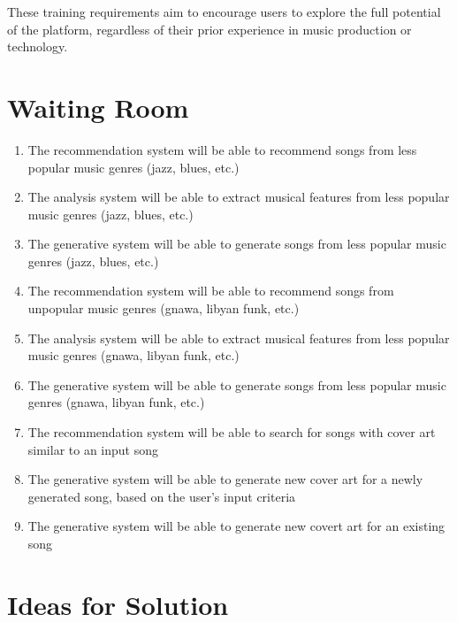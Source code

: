 \documentclass[12pt]{article}
\begin{document}
These training requirements aim to encourage users to explore the full potential of the platform, regardless of their prior experience in music production or technology.


\section{Waiting Room}
\begin{enumerate}
  \item The recommendation system will be able to recommend songs from less popular music genres (jazz, blues, etc.)
  \item The analysis system will be able to extract musical features from less popular music genres (jazz, blues, etc.)
  \item The generative system will be able to generate songs from less popular music genres (jazz, blues, etc.)
  \item The recommendation system will be able to recommend songs from unpopular music genres (gnawa, libyan funk, etc.)
  \item The analysis system will be able to extract musical features from less popular music genres (gnawa, libyan funk, etc.)
  \item The generative system will be able to generate songs from less popular music genres (gnawa, libyan funk, etc.)
  \item The recommendation system will be able to search for songs with cover art similar to an input song
  \item The generative system will be able to generate new cover art for a newly generated song, based on the user's
  input criteria
  \item The generative system will be able to generate new covert art for an existing song
\end{enumerate}

\section{Ideas for Solution}
\end{document}
